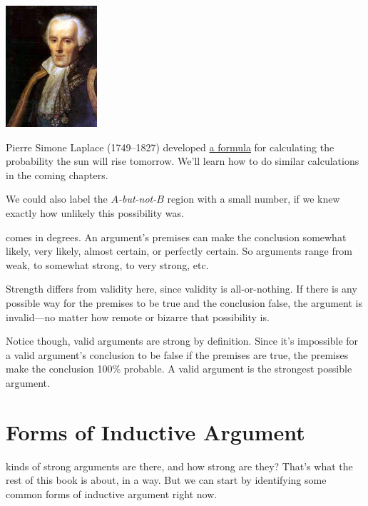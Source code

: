\documentclass[justified]{tufte-book}
\theoremstyle{definition}
\theoremstyle{definition}
\theoremstyle{definition}
\theoremstyle{remark}
\begin{document}
\begin{marginfigure}
\includegraphics[width=1.33in]{img/laplace} \caption[Pierre Simone Laplace (1749--1827) developed \href{https://bit.ly/2mU9WgW}{a formula} for calculating the probability the sun will rise tomorrow. We'll learn how to do similar calculations in the coming chapters.]{Pierre Simone Laplace (1749--1827) developed \href{https://bit.ly/2mU9WgW}{a formula} for calculating the probability the sun will rise tomorrow. We'll learn how to do similar calculations in the coming chapters.}\label{fig:laplace}
\end{marginfigure}

We could also label the \emph{\(A\)-but-not-\(B\)} region with a small number, if we knew exactly how unlikely this possibility was.

 comes in degrees. An argument's premises can make the conclusion somewhat likely, very likely, almost certain, or perfectly certain. So arguments range from weak, to somewhat strong, to very strong, etc.

Strength differs from validity here, since validity is all-or-nothing. If there is any possible way for the premises to be true and the conclusion false, the argument is invalid---no matter how remote or bizarre that possibility is.

Notice though, valid arguments are strong by definition. Since it's impossible for a valid argument's conclusion to be false if the premises are true, the premises make the conclusion 100\% probable. A valid argument is the strongest possible argument.

\hypertarget{indargs}{%
\section{Forms of Inductive Argument}\label{indargs}}

 kinds of strong arguments are there, and how strong are they? That's what the rest of this book is about, in a way. But we can start by identifying some common forms of inductive argument right now.
\end{document}
